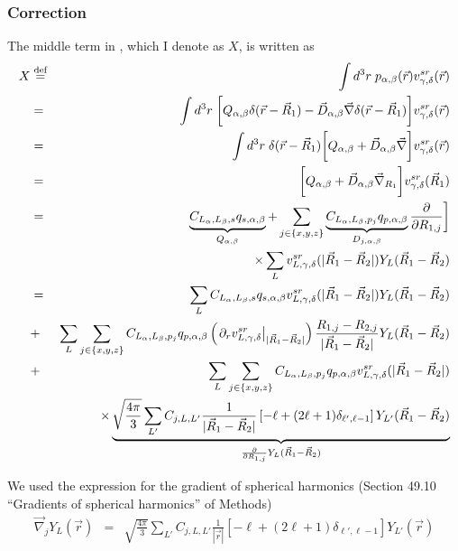 \documentclass[11pt,a4paper]{report}
\begin{document}
\subsubsection{Correction}
The middle term in , which I denote as $X$, is written as
\begin{eqnarray}
X&\defas&
\int d^3r\; p_{\alpha,\beta}(\vec{r})v^{sr}_{\gamma,\delta}(\vec{r})
\nonumber\\
%
%
&=&\int d^3r\; 
\biggl[Q_{\alpha,\beta}\delta(\vec{r}-\vec{R}_1)
-\vec{D}_{\alpha,\beta}\vec{\nabla}\delta(\vec{r}-\vec{R}_1)
\biggr]
v^{sr}_{\gamma,\delta}(\vec{r})
\nonumber\\
%
%
&=&\int d^3r\; \delta(\vec{r}-\vec{R}_1)
\biggl[Q_{\alpha,\beta}+\vec{D}_{\alpha,\beta}\vec{\nabla}\biggr]
v^{sr}_{\gamma,\delta}(\vec{r})
\nonumber\\
%
%
&=&
\biggl[Q_{\alpha,\beta}+\vec{D}_{\alpha,\beta}\vec{\nabla}_{R_1}\biggr]
v^{sr}_{\gamma,\delta}(\vec{R}_1)
\nonumber\\
%
%
&=&\underbrace{C_{L_\alpha,L_\beta,s}q_{s,\alpha,\beta}}_{Q_{\alpha,\beta}}
+\sum_{j\in \{x,y,z\}}
\underbrace{
C_{L_\alpha,L_\beta,p_j}q_{p,\alpha,\beta}
}_{D_{j,\alpha,\beta}}
\frac{\partial}{\partial R_{1,j}}
\biggr]
\nonumber\\
&&\times\sum_{L}v^{sr}_{L,\gamma,\delta}(|\vec{R}_1-\vec{R}_2|)Y_L(\vec{R}_1-\vec{R}_2)
\nonumber\\
%
%
&=&\sum_LC_{L_\alpha,L_\beta,s}q_{s,\alpha,\beta}
v^{sr}_{L,\gamma,\delta}(|\vec{R}_1-\vec{R}_2|)Y_L(\vec{R}_1-\vec{R}_2)
\nonumber\\
%
&+&\sum_L \sum_{j\in \{x,y,z\}} C_{L_\alpha,L_\beta,p_j}q_{p,\alpha,\beta}
\left(\left.\partial_rv^{sr}_{L,\gamma,\delta}\right|_{|\vec{R}_1-\vec{R}_2|}\right)
\frac{R_{1,j}-R_{2,j}}{|\vec{R}_1-\vec{R}_2|}
Y_L(\vec{R}_1-\vec{R}_2)
\nonumber\\
%
&+&\sum_L \sum_{j\in \{x,y,z\}} C_{L_\alpha,L_\beta,p_j}q_{p,\alpha,\beta}
v^{sr}_{L,\gamma,\delta}(|\vec{R}_1-\vec{R}_2|)
\nonumber\\
&&
\times
\underbrace{
\sqrt{\frac{4\pi}{3}}\sum_{L'}
C_{j,L,L'}\frac{1}{|\vec{R}_1-\vec{R}_2|}
\left[-\ell+(2\ell+1)\delta_{\ell',\ell-1}\right]Y_{L'}(\vec{R}_1-\vec{R}_2)
}_{\frac{\partial}{\partial R_{1,j}}Y_L(\vec{R}_1-\vec{R}_2)}
\end{eqnarray}

We used the expression for the gradient of spherical harmonics
(Section 49.10 ``Gradients of spherical harmonics'' of Methods)
\begin{eqnarray}
\vec{\nabla}_jY_L(\vec{r})&=&\sqrt{\frac{4\pi}{3}}\sum_{L'}
C_{j,L,L'}\frac{1}{|\vec{r}|}
\left[-\ell+(2\ell+1)\delta_{\ell',\ell-1}\right]Y_{L'}(\vec{r})
\label{eq:gradientsphericalharmonics}
\end{eqnarray}
\end{document}
